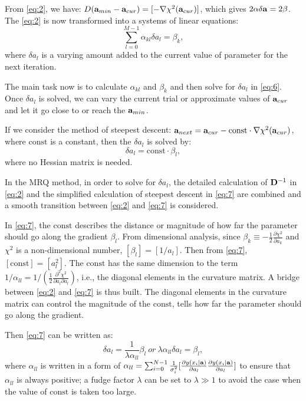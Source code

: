 From \ref{eq:2}, we have: $D({\bf a}_{min}-{\bf a}_{cur}) = [-\nabla\chi^2({\bf a}_{cur})]$, which gives $2{\bf\alpha\delta a}= 2{\bf\beta}$. The \ref{eq:2} is now transformed into a systems of linear equations:
\begin{equation}\label{eq:6}
\sum_{l=0}^{M-1}\alpha_{kl}\delta a_l = \beta_k,
\end{equation} where $\delta a_l$ is 
a varying amount added to the current value of parameter for the next iteration. 

The main task now is to calculate $\alpha_{kl}$ and $\beta_k$ and then solve for $\delta a_l$ in \ref{eq:6}. Once $\delta a_l$ is solved, we can vary the current trial or approximate values of ${\bf a}_{cur}$ and let it go close to or reach the ${\bf a}_{min}$.

If we consider the method of steepest descent: ${\bf a}_{next}={\bf a}_{cur}-\mathrm{const}\cdot\nabla\chi^2({\bf a}_{cur})$, where $\mathrm{const}$ is a constant, then the $\delta a_l$ is solved by: 
\begin{equation}\label{eq:7}
\delta a_l=\mathrm{const}\cdot \beta_l, 
\end{equation}
where no Hessian matrix is needed.

In the MRQ method, in order to solve for $\delta a_l$, the detailed calculation of ${\bf D}^{-1}$ in \ref{eq:2} and the simplified calculation of steepest descent in \ref{eq:7} are combined and a smooth transition between \ref{eq:2} and \ref{eq:7} is considered.

In \ref{eq:7}, the $\mathrm{const}$ describes the distance or magnitude of how far the parameter should go along the gradient $\beta_l$. From dimensional analysis, since $\beta_k\equiv-\frac{1}{2}\frac{\partial\chi^2}{\partial a_k}$ and $\chi^2$ is a non-dimensional number, $[\beta_l]=[1/a_l]$. Then from \ref{eq:7}, $[\mathrm{const}]=[a^2_l]$. The $\mathrm{const}$ has the same dimension to the term $1/\alpha_{ll}= 1/(\frac{1}{2}\frac{\partial^2\chi^2}{\partial a_l\partial a_l})$, i.e., the diagonal elements in the curvature matrix. A bridge between \ref{eq:2} and \ref{eq:7} is thus built. The diagonal elements in the curvature matrix can control the magnitude of the $\mathrm{const}$, tells how far the parameter should go along the gradient. 

Then \ref{eq:7} can be written as:
\begin{equation}\label{eq:8}
\delta a_l = \frac{1}{\lambda \alpha_{ll}}\beta_l~or~\lambda \alpha_{ll}\delta a_l = \beta_l, 
\end{equation} 
where $\alpha_{ll}$ is written in a form of $\alpha_{ll}=\sum_{i=0}^{N-1}\frac{1}{\sigma^2_i}[\frac{\partial y(x_i|{\bf a})}{\partial a_l} \frac{\partial y(x_i|{\bf a})}{\partial a_l}]$ to ensure that $\alpha_{ll}$ is always positive; a fudge factor $\lambda$ can be set to $\lambda \gg 1$ to avoid the case when the value of $\mathrm{const}$ is taken too large.

